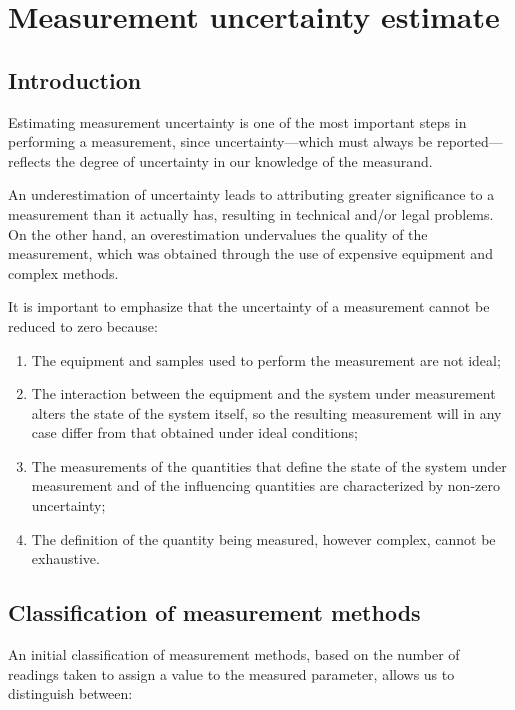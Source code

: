 \documentclass[../main.tex]{subfiles}
\begin{document}
\clearpage
\thispagestyle{empty}
\vspace*{7cm}
\section{Measurement uncertainty estimate}
\vspace*{1.5cm}

\subsection{Introduction}

Estimating measurement uncertainty is one of the most important steps in performing a measurement, since uncertainty—which must always be reported—reflects the degree of uncertainty in our knowledge of the measurand. 

An underestimation of uncertainty leads to attributing greater significance to a measurement than it actually has, resulting in technical and/or legal problems. On the other hand, an overestimation undervalues the quality of the measurement, which was obtained through the use of expensive equipment and complex methods. 

It is important to emphasize that the uncertainty of a measurement cannot be reduced to zero because: 

\begin{enumerate}
	\item[\textbf{-}] The equipment and samples used to perform the measurement are not ideal;
	\item[\textbf{-}] The interaction between the equipment and the system under measurement alters the state of the system itself, so the resulting measurement will in any case differ from that obtained under ideal conditions;
	\item[\textbf{-}] The measurements of the quantities that define the state of the system under measurement and of the influencing quantities are characterized by non-zero uncertainty;
	\item[\textbf{-}] The definition of the quantity being measured, however complex, cannot be exhaustive.
\end{enumerate}

\subsection{Classification of measurement methods}


An initial classification of measurement methods, based on the number of readings taken to assign a value to the measured parameter, allows us to distinguish between:\\
\end{document}

